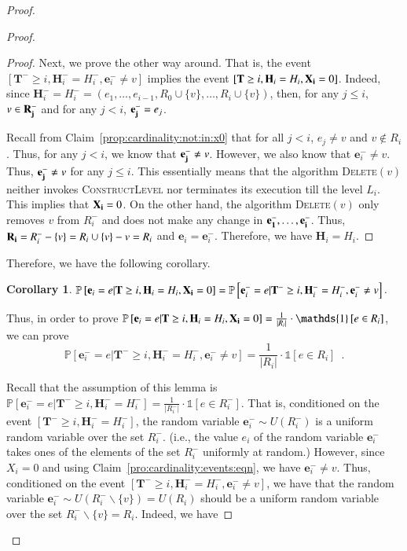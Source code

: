 \documentclass[11pt]{article}
\newtheorem{corollary}[theorem]{Corollary}
\renewcommand{\Pr}[1]{\ensuremath{\mathbb{P}\left[#1\right]}}
\newcommand{\ind}[1]{\ensuremath{\mathds{1}\left[#1\right]}}
\newcommand{\constLevel}{\textsc{ConstructLevel}}
\newcommand{\deletev}{{\textsc{Delete}}}
\newcommand{\bE}{\ensuremath{\mathbf{e}}}
\newcommand{\bT}{\ensuremath{\mathbf{T}}}
\newcommand{\bH}{\ensuremath{\mathbf{H}}}
\begin{document}
\begin{proof}
\begin{proof}
\begin{proof}
Next, we prove the other way around. 
That is, the event $[\bT^- \geq i, \bH_i^- = H_i^-,\bE_i^- \neq v]$ 
implies the event $[\bT \geq i, \bH_i = H_i, \bold{X_i} = 0]$. 
Indeed, since $\bH_i^- = H_i^- = (e_1, \dots, e_{i-1}, R_0 \cup \{v\} , \dots, R_i \cup \{v\})$, 
then, for any $j \leq i$, $v \in \bold{R_j^-}$ and for any $j < i$, $\bold{e_j^-} = e_j$. 

Recall from Claim~\ref{prop:cardinality:not:in:x0} that 
for all $j < i$, $e_j \ne v$ and $v \notin R_i$. 
Thus, for any $j < i$, we know that $\bold{e_j^-} \ne v$. 
However, we also know that $\bE_i^- \neq v$. 
Thus, $\bold{e_j^-} \ne v$ for any $j \leq i$.
This essentially means that the algorithm \deletev$(v)$ neither invokes \constLevel{} 
nor terminates its execution till the level $L_i$. 
This implies that $\bold{X_i} = 0$. 
On the other hand, the algorithm \deletev$(v)$ only removes $v$ from $R_i^-$ and 
does not make any change in $\bold{e_1^-, \dots, e_i^-}$. 
Thus, $\bold{R_i} = R_i^- - \{v\}= R_i \cup \{v\} - v = R_i$ and 
$\bE_i = \bE_i^-$.  Therefore,  we have $\bH_i = H_i$. 
\end{proof}




Therefore, we have the following corollary.
\begin{corollary}
\label{cor:cardinality:eqn:events}
$\Pr{\bE_i = e | \bT \geq i, \bH_i = H_i, \bold{X_i} = 0} =  \Pr{\bE_i^- = e | \bT^- \geq i, \bH_i^- = H_i^-, \bE_i^- \neq v} $. 
\end{corollary}

Thus, in order to prove 
$\Pr{\bE_i = e | \bT \geq i, \bH_i = H_i, \bold{X_i} = 0} = \frac{1}{|R_i|} \cdot \ind{e \in R_i}$, 
we can prove 
\[
\Pr{\bE_i^- = e | \bT^- \geq i, \bH_i^- = H_i^-, \bE_i^- \neq v} = \frac{1}{|R_i|} \cdot \ind{e \in R_i} \enspace .
\]



Recall that the assumption of this lemma is  
$ \Pr{\bE_i^- = e | \bT^- \geq i, \bH_i^- = H_i^-} = 
  \frac{1}{|R_i^{-}|} \cdot \ind{e \in R_i^{-}} $. 
That is, conditioned on the event $[\bT^- \geq i, \bH_i^- = H_i^-]$, 
the random variable $\bE_i^- \sim U(R_i^-)$ is a uniform random variable over the set $R_i^-$. 
(i.e., the value $e_i$ of the random variable $\bE_i^-$ takes ones of the elements of the set $R_i^-$ uniformly at random.)  
However, since $X_i =0$ and using Claim~\ref{pro:cardinality:events:eqn}, we have $\bE_i^- \ne v$. 
Thus, conditioned on the event $ [\bT^- \geq i, \bH_i^- = H_i^-, \bE_i^- \ne v]$, 
we have that the random variable $\bE_i^- \sim U(R_i^- \backslash \{v\} ) = U(R_i)$ 
should be a uniform random variable over the set $R_i^- \backslash \{v\} = R_i$. 
Indeed, we have 



\end{proof}
\end{proof}
\end{document}
